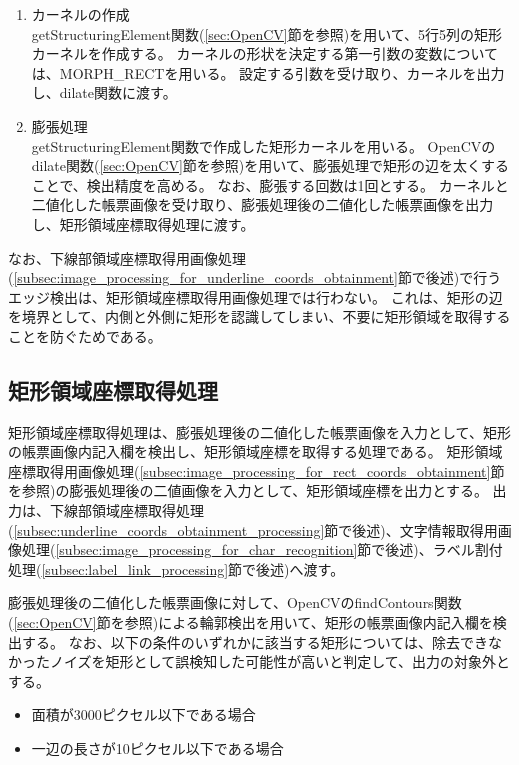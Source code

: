 \begin{enumerate}
    \item カーネルの作成\\
        getStructuringElement関数(\ref{sec:OpenCV}節を参照)を用いて、5行5列の矩形カーネルを作成する。
        カーネルの形状を決定する第一引数の変数については、MORPH\_RECTを用いる。
        設定する引数を受け取り、カーネルを出力し、dilate関数に渡す。
    \item 膨張処理\\
        getStructuringElement関数で作成した矩形カーネルを用いる。
        OpenCVのdilate関数(\ref{sec:OpenCV}節を参照)を用いて、膨張処理で矩形の辺を太くすることで、検出精度を高める。
        なお、膨張する回数は1回とする。
        カーネルと二値化した帳票画像を受け取り、膨張処理後の二値化した帳票画像を出力し、矩形領域座標取得処理に渡す。
\end{enumerate}

なお、下線部領域座標取得用画像処理(\ref{subsec:image_processing_for_underline_coords_obtainment}節で後述)で行うエッジ検出は、矩形領域座標取得用画像処理では行わない。
これは、矩形の辺を境界として、内側と外側に矩形を認識してしまい、不要に矩形領域を取得することを防ぐためである。

\subsection{矩形領域座標取得処理}\label{subsec:rect_coords_obtainment_processing}
矩形領域座標取得処理は、膨張処理後の二値化した帳票画像を入力として、矩形の帳票画像内記入欄を検出し、矩形領域座標を取得する処理である。
矩形領域座標取得用画像処理(\ref{subsec:image_processing_for_rect_coords_obtainment}節を参照)の膨張処理後の二値画像を入力として、矩形領域座標を出力とする。
出力は、下線部領域座標取得処理(\ref{subsec:underline_coords_obtainment_processing}節で後述)、文字情報取得用画像処理(\ref{subsec:image_processing_for_char_recognition}節で後述)、ラベル割付処理(\ref{subsec:label_link_processing}節で後述)へ渡す。

膨張処理後の二値化した帳票画像に対して、OpenCVのfindContours関数(\ref{sec:OpenCV}節を参照)による輪郭検出を用いて、矩形の帳票画像内記入欄を検出する。
なお、以下の条件のいずれかに該当する矩形については、除去できなかったノイズを矩形として誤検知した可能性が高いと判定して、出力の対象外とする。

\begin{itemize}
    \item 面積が3000ピクセル以下である場合
    \item 一辺の長さが10ピクセル以下である場合
\end{itemize}


